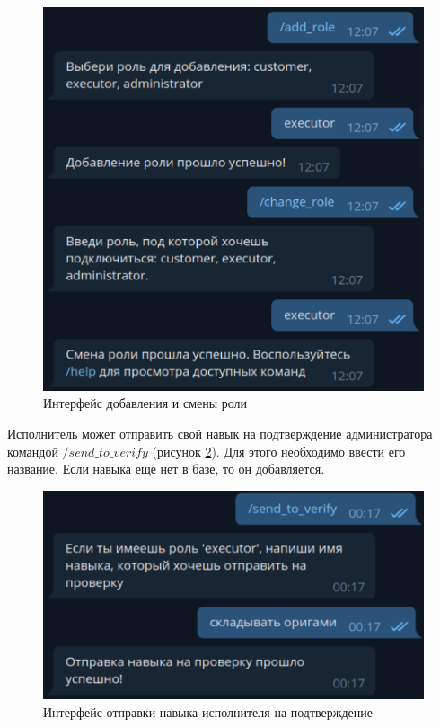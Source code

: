 \begin{figure}[H]
	\begin{center}
		\includegraphics[page=1,scale=0.5]{assets/add_role.pdf}
	\end{center}
	\caption{Интерфейс добавления и смены роли}
	\label{add_role}
\end{figure}

Исполнитель может отправить свой навык на подтверждение администратора командой $/send\_to\_verify$ (рисунок \ref{send_to_verify}). Для этого необходимо ввести его название. Если навыка еще нет в базе, то он добавляется.

\begin{figure}[H]
	\begin{center}
		\includegraphics[page=1,scale=0.5]{assets/send_to_verify.pdf}
	\end{center}
	\caption{Интерфейс отправки навыка исполнителя на подтверждение}
	\label{send_to_verify}
\end{figure}


